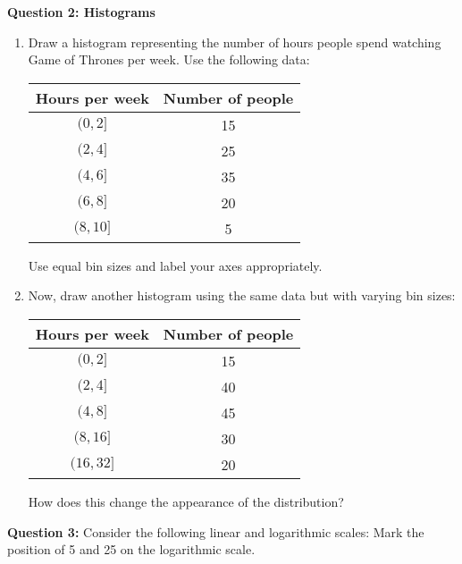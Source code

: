 \documentclass[a4paper, 14pt]{extarticle}
\begin{document}
\begin{minipage}{\textwidth}
    {\bf Question 2: Histograms}

    \begin{enumerate}
        \item Draw a histogram representing the number of hours people spend watching Game of Thrones per week. Use the following data:

        \begin{center}
            \begin{tabular}{|c|c|}
                \hline
                Hours per week & Number of people \\
                \hline
                $(0,2]$ & 15 \\
                $(2,4]$ & 25 \\
                $(4,6]$ & 35 \\
                $(6,8]$ & 20 \\
                $(8,10]$ & 5 \\
                \hline
            \end{tabular}
        \end{center}

        Use equal bin sizes and label your axes appropriately.

        \item Now, draw another histogram using the same data but with varying bin sizes:
        \begin{center}
            \begin{tabular}{|c|c|}
                \hline
                Hours per week & Number of people \\
                \hline
                $(0,2]$ & 15 \\
                $(2,4]$ & 40 \\
                $(4,8]$ & 45 \\
                $(8,16]$ & 30 \\
                $(16,32]$ & 20 \\
                \hline
            \end{tabular}
        \end{center}
        How does this change the appearance of the distribution?
    \end{enumerate}
\end{minipage}

\newpage

{\bf Question 3:} Consider the following linear and logarithmic scales:
Mark the position of 5 and 25 on the logarithmic scale.
\end{document}
